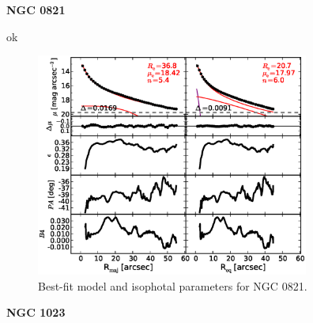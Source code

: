 \documentclass[preprint2]{emulateapj}
\newcommand{\fitfigurewidth}{0.8\textwidth}
\begin{document}
  \clearpage\newpage\noindent

  {\bf NGC 0821 \\}

  ok

  \begin{figure}[h]
  \begin{center}
  \includegraphics[width=\fitfigurewidth]{images/n0821_1Dfit.eps}
  \caption{Best-fit model and isophotal parameters for NGC 0821.}
  \end{center}
  \end{figure}


  \clearpage\newpage\noindent
  {\bf NGC 1023 \\}
  
\end{document}
